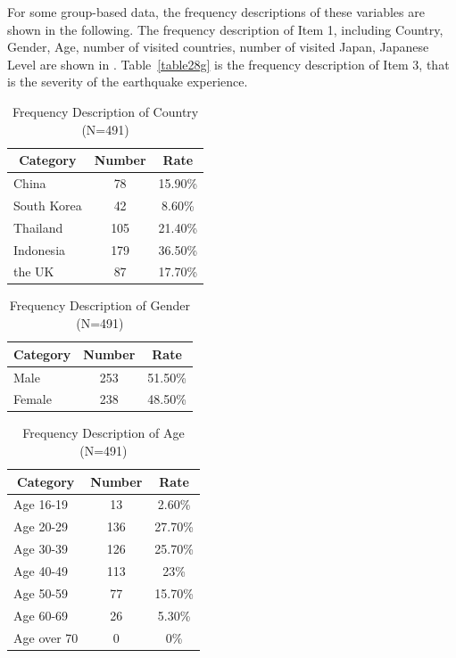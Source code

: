 For some group-based data, the frequency descriptions of these variables are shown in the following. The frequency description of Item 1, including Country, Gender, Age, number of visited countries, number of visited Japan, Japanese Level are shown in . Table~\ref{table28g} is the frequency description of Item 3, that is the severity of the earthquake experience.

\begin{table}[h]
  \caption[Frequency Description of Country]{Frequency Description of Country (N=491)}
  \label{table28a}
  \centering
  \begin{tabular}{l|cc}
 \hline
\multicolumn{1}{c|}{Category}&Number&Rate\\
 \hline
China&78&15.90\%\\
South Korea&42&8.60\%\\
Thailand&105&21.40\%\\
Indonesia&179&36.50\%\\
the UK&87&17.70\%\\
 \hline
  \end{tabular}
\end{table}

\begin{table}[h]
  \caption[Frequency Description of Gender]{Frequency Description of Gender (N=491)}
  \label{table28b}
  \centering
  \begin{tabular}{l|cc}
 \hline
\multicolumn{1}{c|}{Category}&Number&Rate\\
 \hline
Male   & 253 & 51.50\% \\
Female & 238 & 48.50\% \\
 \hline
  \end{tabular}
\end{table}

\begin{table}[h]
  \caption[Frequency Description of Age]{Frequency Description of Age (N=491)}
  \label{table28c}
  \centering
  \begin{tabular}{l|cc}
 \hline
\multicolumn{1}{c|}{Category}&Number&Rate\\
 \hline
Age 16-19   & 13  & 2.60\%  \\
Age 20-29   & 136 & 27.70\% \\
Age 30-39   & 126 & 25.70\% \\
Age 40-49   & 113 & 23\%    \\
Age 50-59   & 77  & 15.70\% \\
Age 60-69   & 26  & 5.30\%  \\
Age over 70 & 0   & 0\% \\
 \hline
  \end{tabular}
\end{table}

